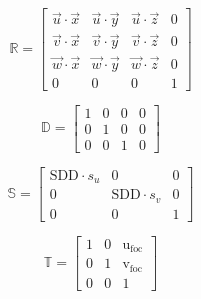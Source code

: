 \documentclass[10pt, a4paper, fleqn]{scrartcl}
\begin{document}
\begin{equation*}
\mathds{R}=\begin{bmatrix}
\vec{u} \cdot \vec{x} & \vec{u} \cdot \vec{y} & \vec{u} \cdot \vec{z} & 0\\
\vec{v} \cdot \vec{x} & \vec{v} \cdot \vec{y} & \vec{v} \cdot \vec{z} & 0\\
\vec{w} \cdot \vec{x} & \vec{w} \cdot \vec{y} & \vec{w} \cdot \vec{z} & 0\\
0 & 0 & 0 & 1
\end{bmatrix}
\end{equation*}

\begin{equation*}
\mathds{D}=\begin{bmatrix}
1 & 0 & 0 & 0 \\
0 & 1 & 0 & 0 \\
0 & 0 & 1 & 0
\end{bmatrix}
\end{equation*}

\begin{equation*}
\mathds{S}=\begin{bmatrix}
\text{SDD}\cdot s_u & 0 & 0 \\
0 & \text{SDD}\cdot s_v & 0 \\
0 & 0 & 1
\end{bmatrix}
\end{equation*}

\begin{equation*}
\mathds{T}=\begin{bmatrix}
1 & 0 & \text{u}_\text{foc} \\
0 & 1 & \text{v}_\text{foc} \\
0 & 0 & 1
\end{bmatrix}
\end{equation*}
\end{document}
